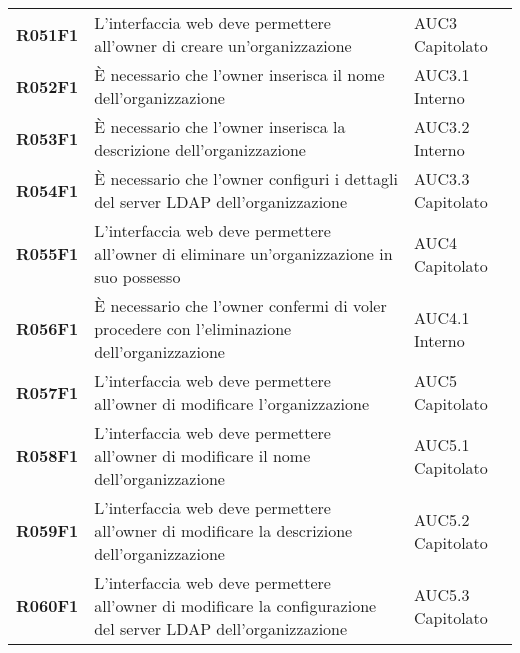 \documentclass[../analisi-dei-requisiti.tex]{subfiles}
\begin{document}
\begin{longtable}[H]{>{\centering\bfseries}m{3cm} >{\centering}m{10cm} >{\centering\arraybackslash}m{3cm}}
  R051F1                               & L'interfaccia web deve permettere all'owner di creare un'organizzazione                                                                                                                                 & AUC3 Capitolato             \\
  R052F1                               & È necessario che l'owner inserisca il nome dell'organizzazione                                                                                                                                          & AUC3.1 Interno              \\
  R053F1                               & È necessario che l'owner inserisca la descrizione dell'organizzazione                                                                                                                                   & AUC3.2 Interno              \\
  R054F1                               & È necessario che l'owner configuri i dettagli del server LDAP dell'organizzazione                                                                                                                       & AUC3.3 Capitolato           \\
  R055F1                               & L'interfaccia web deve permettere all'owner di eliminare un'organizzazione in suo possesso                                                                                                              & AUC4 Capitolato             \\
  R056F1                               & È necessario che l'owner confermi di voler procedere con l'eliminazione dell'organizzazione                                                                                                             & AUC4.1 Interno              \\
  R057F1                               & L'interfaccia web deve permettere all'owner di modificare l'organizzazione                                                                                                                              & AUC5 Capitolato             \\
  R058F1                               & L'interfaccia web deve permettere all'owner di modificare il nome dell'organizzazione                                                                                                                   & AUC5.1 Capitolato           \\
  R059F1                               & L'interfaccia web deve permettere all'owner di modificare la descrizione dell'organizzazione                                                                                                            & AUC5.2 Capitolato           \\
  R060F1                               & L'interfaccia web deve permettere all'owner di modificare la configurazione del server LDAP dell'organizzazione                                                                                         & AUC5.3 Capitolato           \\


\end{longtable}
\end{document}
